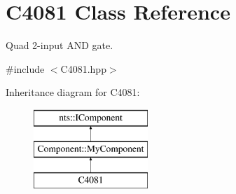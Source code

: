 \hypertarget{classC4081}{}\section{C4081 Class Reference}
\label{classC4081}


Quad 2-\/input A\+ND gate.  




{\ttfamily \#include $<$C4081.\+hpp$>$}

Inheritance diagram for C4081\+:\begin{figure}[H]
\begin{center}
\leavevmode
\includegraphics[height=3.000000cm]{classC4081}
\end{center}
\end{figure}
